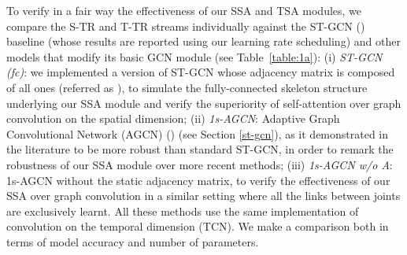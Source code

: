 \documentclass[times,twocolumn,final,authoryear]{elsarticle}
\begin{document}
To verify in a fair way the effectiveness of our SSA and TSA modules, we compare the S-TR and T-TR streams individually against the ST-GCN (\cite{yan2018spatial}) baseline (whose results are reported using our learning rate scheduling) and other models that modify its basic GCN module (see Table~\ref{table:1a}): (i) \textit{ST-GCN (fc)}: we implemented a version of ST-GCN whose adjacency matrix is composed of all ones (referred as ), to simulate the fully-connected skeleton structure underlying our SSA module and verify the superiority of self-attention over graph convolution on the spatial dimension; (ii) \textit{1s-AGCN}: Adaptive Graph Convolutional Network (AGCN) (\cite{Shi2018TwoStreamAG}) (see Section \ref{st-gcn}), as it demonstrated in the literature to be more robust than standard ST-GCN, in order to remark the robustness of our SSA module over more recent methods; (iii) \textit{1s-AGCN w/o A}: 1s-AGCN without the static adjacency matrix, to verify the effectiveness of our SSA over graph convolution in a similar setting where all the links between joints are exclusively learnt. 
All these methods use the same implementation of convolution on the temporal dimension (TCN). We make a comparison both in terms of model accuracy and number of parameters.
\setlength{\tabcolsep}{0.5pt}
\end{document}
